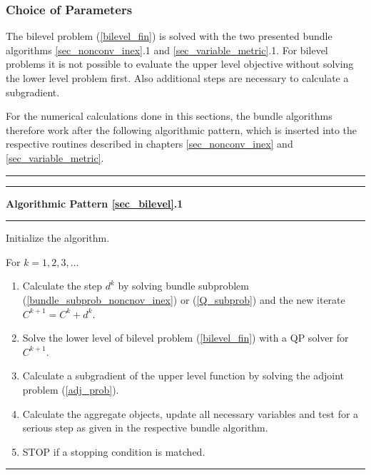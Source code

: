 \subsubsection{Choice of Parameters}

The bilevel problem (\ref{bilevel_fin}) is solved with the two presented bundle algorithms \ref{sec_nonconv_inex}.1 and \ref{sec_variable_metric}.1.
For bilevel problems it is not possible to evaluate the upper level objective without solving the lower level problem first. Also additional steps are necessary to calculate a subgradient.

For the numerical calculations done in this sections, the bundle algorithms therefore work after the following algorithmic pattern, which is inserted into the respective routines described in chapters \ref{sec_nonconv_inex} and \ref{sec_variable_metric}.

\begin{minipage}\linewidth
\vspace{1em}
\hrule  \vspace{0.4ex} \hrule
\vspace{1ex}
\textbf{Algorithmic Pattern \ref{sec_bilevel}.1}
\vspace{1ex}
\hrule
\vspace{1ex}
Initialize the algorithm.
\end{minipage}

For \(k = 1,2,3,  \dotsc \)   

\begin{enumerate}
	\item Calculate the step \(d^k\) by solving bundle subproblem (\ref{bundle_subprob_noncnov_inex}) or (\ref{Q_subprob}) and the new iterate \(C^{k+1} = C^k+d^k\).
		\item Solve the lower level of bilevel problem (\ref{bilevel_fin}) with a QP solver for \(C^{k+1}\). 
	\item Calculate a subgradient of the upper level function by solving the adjoint problem (\ref{adj_prob}).
	\item Calculate the aggregate objects, update all necessary variables and test for a serious step as given in the respective bundle algorithm.
	\item STOP if a stopping condition is matched.
\end{enumerate}
\vspace{1ex}
\hrule

\vspace{1.5em}

